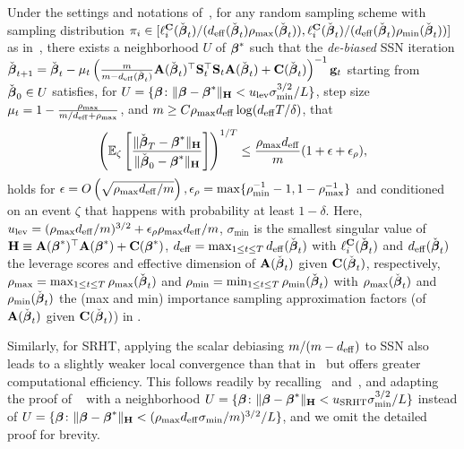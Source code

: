 \documentclass[11pt,a4paper]{article}
\begin{document}
\begin{corollary}\label{coro:ssn_exact_approximate_lev}
Under the settings and notations of~,
for any random sampling scheme with sampling distribution
$\pi_i\in [\ell^{\mathbf{C}}_{i}(\check{\boldsymbol{\beta}}_t)/(d_{\mathrm{eff}}(\check{\boldsymbol{\beta}}_t) \rho_{\max}(\check{\boldsymbol{\beta}}_t)), \ell^{\mathbf{C}}_{i}(\check{\boldsymbol{\beta}}_t)/(d_{\mathrm{eff}}(\check{\boldsymbol{\beta}}_t) \rho_{\min}(\check{\boldsymbol{\beta}}_t))]$ as in~, there exists a neighborhood $U$ of $\boldsymbol{\beta}^{\ast}$ such that the \emph{de-biased} SSN iteration  $ \check{\boldsymbol{\beta}}_{t+1}= \check{\boldsymbol{\beta}}_{t}-\mu_t \left(\frac{m}{m-d_{\mathrm{eff}}(\check{\boldsymbol{\beta}}_t)}\mathbf{A}(\check{\boldsymbol{\beta}}_t)^\top \mathbf{S}_t^\top  \mathbf{S}_t \mathbf{A}(\check{\boldsymbol{\beta}}_t)+\mathbf{C}(\check{\boldsymbol{\beta}}_t) \right)^{-1}\mathbf{g}_t$ starting from $\check{\boldsymbol{\beta}}_0 \in U$ satisfies, for $U=\{\boldsymbol{\beta} \colon \|\boldsymbol{\beta}-\boldsymbol{\beta}^{\ast}\|_{\mathbf{H}}< u_{\rm lev}\sigma_{\min}^{3/2}/L\}$, step size $\mu_t=1-\frac{\rho_{\max} }{m/d_{\mathrm{eff}} + \rho_{\max} }$,  and $m\geq C\rho_{\max} d_{\mathrm{eff}}\log(d_{\mathrm{eff}}T/\delta ) $, that
\begin{equation*}
   \left( {\mathbb{E}}_{\zeta}\left[\frac{\|\check{\boldsymbol{\beta}}_T-\boldsymbol{\beta}^{\ast}\|_{\mathbf{H}}}{\|\check{\boldsymbol{\beta}}_0-\boldsymbol{\beta}^{\ast}\|_{\mathbf{H}}}\right]\right)^{1/T}\leq \frac{\rho_{\max} d_{\mathrm{eff}}}{m} ( 1+ \epsilon+\epsilon_{\rho}), 
\end{equation*}
holds for $\epsilon= O\left(\sqrt{\rho_{\max} d_{\mathrm{eff}}/m}\right), \epsilon_{\rho}=\max\{\rho_{\min}^{-1}-1,1 - \rho_{\max}^{-1}\}$ and conditioned on an event $\zeta$ that happens with probability at least $1-\delta$. Here, $u_{\rm lev}=(\rho_{\max} d_{\mathrm{eff}} /m)^{3/2}+\epsilon_{\rho}\rho_{\max} d_{\mathrm{eff}}/m$, $\sigma_{\min}$ is the smallest singular value of $\mathbf{H} \equiv\mathbf{A}(\boldsymbol{\beta}^{\ast}) ^\top\mathbf{A}(\boldsymbol{\beta}^{\ast})+\mathbf{C}(\boldsymbol{\beta}^{\ast})$, $d_{\mathrm{eff}}=\max_{1\leq t \leq T}d_{\mathrm{eff}}(\check{\boldsymbol{\beta}}_t)$ with $\ell_{i}^{\mathbf{C}}(\check{\boldsymbol{\beta}}_t)$ and  $d_{\mathrm{eff}}(\check{\boldsymbol{\beta}}_t)$ the leverage scores and effective dimension of $\mathbf{A}(\check{\boldsymbol{\beta}}_t)$ given $\mathbf{C}(\check{\boldsymbol{\beta}}_t)$, respectively, $\rho_{\max}=\max_{1\leq t \leq T}\rho_{\max}(\check{\boldsymbol{\beta}}_t)$ and $\rho_{\min}=\min_{1\leq t \leq T}\rho_{\min}(\check{\boldsymbol{\beta}}_t)$ with $\rho_{\max}(\check{\boldsymbol{\beta}}_t)$  and $\rho_{\min}(\check{\boldsymbol{\beta}}_t)$ the (max and min)  importance sampling approximation   factors (of $\mathbf{A}(\check{\boldsymbol{\beta}}_t)$ given $\mathbf{C}(\check{\boldsymbol{\beta}}_t)$) in .
\end{corollary}

Similarly, for SRHT, applying the scalar debiasing  $m/(m-d_{\mathrm{eff}})$ to SSN  also  leads to a   slightly weaker local convergence than that in~  but offers greater computational efficiency. This follows  readily  by
recalling~ and~,  and adapting the proof of ~ with a neighborhood  $U=\{\boldsymbol{\beta} \colon \|\boldsymbol{\beta}-\boldsymbol{\beta}^{\ast}\|_{\mathbf{H}}< u_{\rm SRHT}\sigma_{\min}^{3/2}/L\}$ instead of  $U=\{\boldsymbol{\beta} \colon \|\boldsymbol{\beta}-\boldsymbol{\beta}^{\ast}\|_{\mathbf{H}}< (\rho_{\max} d_{\mathrm{eff}} \sigma_{\min}/m)^{3/2}/L\}$, and we omit the detailed proof for brevity.
\end{document}
